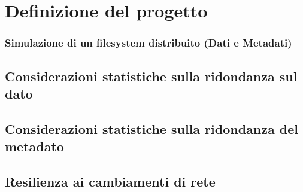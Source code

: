 \chapter{Definizione del progetto}
\setcounter{section}{1}

\subsection{Simulazione di un filesystem distribuito (Dati e Metadati)}
\section{Considerazioni statistiche sulla ridondanza sul dato}
\section{Considerazioni statistiche sulla ridondanza del metadato}
\section{Resilienza ai cambiamenti di rete}